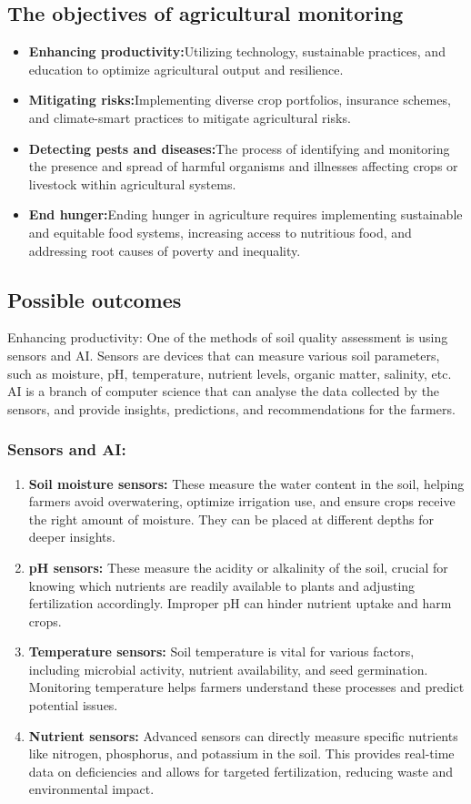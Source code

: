 \documentclass{article}
\begin{document}
\subsection{The objectives of agricultural monitoring}
 \begin{itemize}
     \item\textbf{Enhancing productivity:}Utilizing technology, sustainable practices,
and education to optimize agricultural output and resilience.
\item \textbf{Mitigating risks:}Implementing diverse crop portfolios, insurance schemes,
and climate-smart practices to mitigate agricultural risks.
\item \textbf{Detecting pests and diseases:}The process of identifying and monitoring the presence and spread of harmful organisms and illnesses
affecting crops or livestock within agricultural systems.

\item \textbf{End hunger:}Ending hunger in agriculture requires implementing sustainable and equitable food systems, increasing access to nutritious
food, and addressing root causes of poverty and inequality.
\end{itemize}
\subsection{Possible outcomes}
Enhancing productivity: One of the methods of soil quality assessment is using sensors and AI. Sensors are devices that can measure 
various soil parameters, such as moisture, pH, temperature, nutrient levels, organic matter, salinity, etc. AI is 
a branch of computer science that can analyse the data collected by the sensors, and provide insights, 
predictions, and recommendations for the farmers.
\subsubsection{Sensors and AI:}
\begin{enumerate}
\item\textbf{Soil moisture sensors:}  These measure the water content in the soil, helping farmers avoid overwatering, optimize irrigation use, and ensure crops receive the right amount of moisture. They can be 
placed at different depths for deeper insights.
\item\textbf{pH sensors:} These measure the acidity or alkalinity of the soil, crucial for knowing which nutrients are 
readily available to plants and adjusting fertilization accordingly. Improper pH can hinder nutrient uptake 
and harm crops.
\item\textbf{Temperature sensors:} Soil temperature is vital for various factors, including microbial 
activity, nutrient availability, and seed germination. Monitoring temperature helps farmers understand 
these processes and predict potential issues.
\item\textbf{Nutrient sensors:}  Advanced sensors can directly measure specific nutrients like 
nitrogen, phosphorus, and potassium in the soil. This provides real-time data on deficiencies and allows 
for targeted fertilization, reducing waste and environmental impact.
\end{enumerate}
\vspace{.5cm}
\newpage
\end{document}
